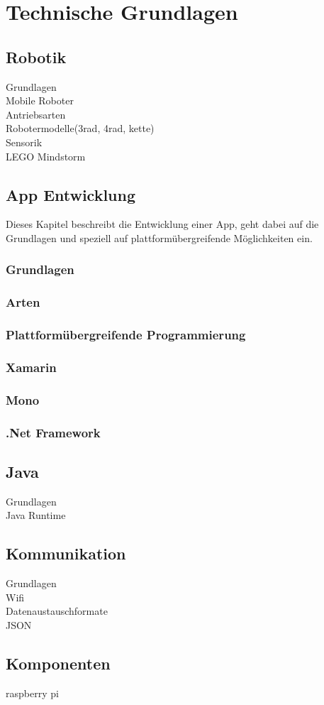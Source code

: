 \section{Technische Grundlagen}
\subsection{Robotik}
Grundlagen\\
Mobile Roboter\\
Antriebsarten\\
Robotermodelle(3rad, 4rad, kette)\\
Sensorik\\
LEGO Mindstorm\\
\subsection{App Entwicklung}

Dieses Kapitel beschreibt die Entwicklung einer App, geht dabei auf die Grundlagen und speziell auf plattformübergreifende Möglichkeiten ein.

\subsubsection{Grundlagen}
\subsubsection{Arten}
\subsubsection{Plattformübergreifende Programmierung}
\subsubsection{Xamarin}
\subsubsection{Mono}
\subsubsection{.Net Framework}

\subsection{Java}
Grundlagen\\
Java Runtime\\
\subsection{Kommunikation}
Grundlagen\\
Wifi\\
Datenaustauschformate\\
JSON\\
\subsection{Komponenten}
raspberry pi\\